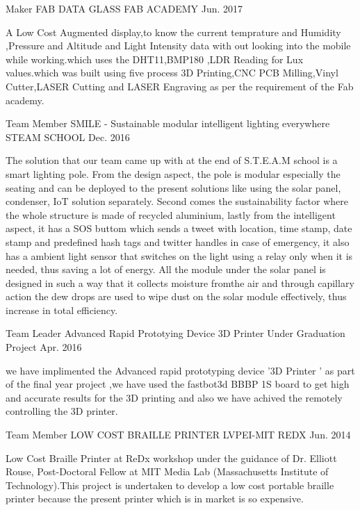 \begin{cventries}
  \cventry
    {Maker}
    {FAB DATA GLASS}
    {FAB ACADEMY}
    {Jun. 2017}
    {
      \begin{cvitems}
        \item {A Low Cost Augmented display,to know the current temprature and Humidity ,Pressure and Altitude and Light Intensity data with out looking into the mobile while working.which uses the DHT11,BMP180 ,LDR Reading for Lux values.which was built using five process 3D Printing,CNC PCB Milling,Vinyl Cutter,LASER Cutting and LASER Engraving  as per the requirement of the Fab academy. }
      \end{cvitems}
    }
   \cventry
    {Team Member}
    {SMILE - Sustainable modular intelligent lighting everywhere}
    {STEAM SCHOOL}
    {Dec. 2016}
    {
      \begin{cvitems}
        \item {The solution that our team came up with at the end of S.T.E.A.M school is a smart lighting pole. From the design aspect, the pole is modular especially the seating and can be deployed to the present solutions like using the solar panel, condenser, IoT solution separately. Second comes the sustainability factor where the whole structure is made of recycled aluminium, lastly from the intelligent aspect, it has a SOS buttom which sends a tweet with location, time stamp, date stamp and predefined hash tags and twitter handles in case of emergency, it also has a ambient light sensor that switches on the light using a relay only when it is needed, thus saving a lot of energy. All the module under the solar panel is designed in such a way that it collects moisture fromthe air and through capillary action the dew drops are used to wipe dust on the solar module effectively, thus increase in total efficiency.}
      \end{cvitems}
    }
  \cventry
    {Team Leader}
    {Advanced Rapid Prototying Device 3D Printer}
    {Under Graduation Project}
    {Apr. 2016}
    {
      \begin{cvitems}
        \item {we have implimented the Advanced rapid prototyping device '3D Printer ' as part of the final year project ,we have used the fastbot3d BBBP 1S board to get high and accurate results for the 3D printing and also we have achived the remotely controlling the 3D printer.}
      \end{cvitems}
    }
  \cventry
    {Team Member}
    {LOW COST BRAILLE PRINTER}
    {LVPEI-MIT REDX }
    {Jun. 2014}
    {
      \begin{cvitems}
        \item { Low Cost Braille Printer at ReDx workshop under the guidance of Dr. Elliott Rouse, Post-Doctoral Fellow at MIT Media Lab (Massachusetts Institute of Technology).This project is undertaken to develop a low cost portable braille printer because the present printer which is in market is so expensive.}
      \end{cvitems}
    }
\end{cventries}